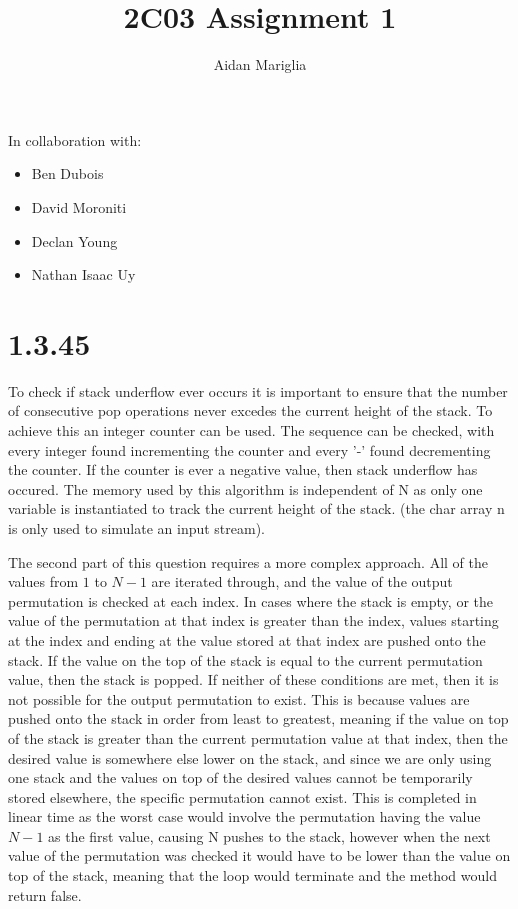 \documentclass[12pt]{article}
\title{2C03 Assignment 1}
\author{Aidan Mariglia}
\begin{document}
\maketitle

In collaboration with:
\begin{itemize}[noitemsep]
  \item Ben Dubois
  \item David Moroniti
  \item Declan Young
  \item Nathan Isaac Uy
\end{itemize}


\section*{1.3.45}
  

To check if stack underflow ever occurs it is important to ensure that
the number of consecutive pop operations never excedes the current height
of the stack. To achieve this an integer counter can be used. The sequence
can be checked, with every integer found incrementing the counter and every
'-' found decrementing the counter. If the counter is ever a negative value,
then stack underflow has occured. The memory used by this algorithm is
independent of N as only one variable is instantiated to track the current
height of the stack. (the char array n is only used to simulate an input stream).


The second part of this question requires a more complex approach. All of the
values from $1$ to $N-1$ are iterated through, and the value of the output
permutation is checked at each index. In cases where the stack is empty, or 
the value of the permutation at that index is greater than the index, values
starting at the index and ending at the value stored at that index are pushed
onto the stack. If the value on the top of the stack is equal to the current 
permutation value, then the stack is popped. If neither of these conditions are
met, then it is not possible for the output permutation to exist. This is because
values are pushed onto the stack in order from least to greatest, meaning if the
value on top of the stack is greater than the current permutation value at that
index, then the desired value is somewhere else lower on the stack, and since we 
are only using one stack and the values on top of the desired values cannot be 
temporarily stored elsewhere, the specific permutation cannot exist.
This is completed in linear time as the worst case would involve the permutation
having the value $N-1$ as the first value, causing N pushes to the stack, however
when the next value of the permutation was checked it would have to be lower than
the value on top of the stack, meaning that the loop would terminate and the method
would return false.
\end{document}
